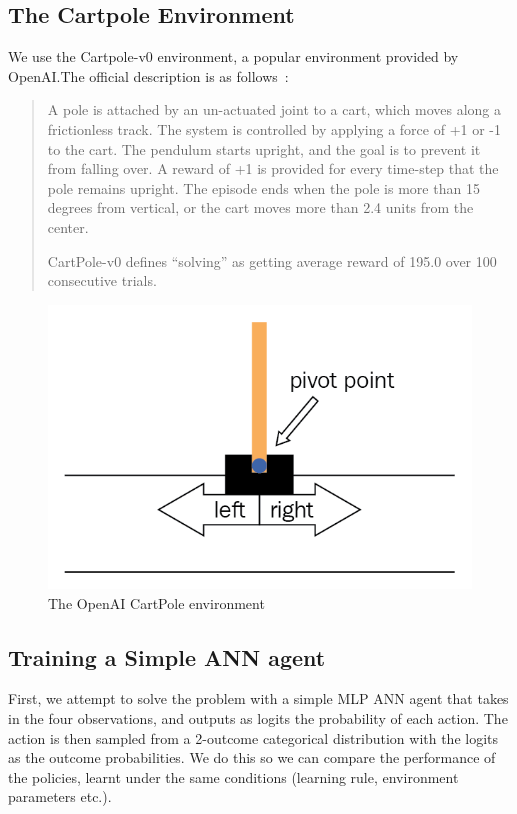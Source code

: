 \documentclass[fyp]{socreport}
\begin{document}
\subsection{The Cartpole Environment}


We use the Cartpole-v0 environment, a popular environment provided by
OpenAI.\@ The official description is as follows~\cite{openai_gym}:

\begin{quote} A pole is attached by an un-actuated joint to a cart, which moves
along a frictionless track. The system is controlled by applying a force of +1
or -1 to the cart. The pendulum starts upright, and the goal is to prevent it
from falling over. A reward of +1 is provided for every time-step that the pole
remains upright. The episode ends when the pole is more than 15 degrees from
vertical, or the cart moves more than 2.4 units from the center.

CartPole-v0 defines ``solving'' as getting average reward of 195.0 over 100
consecutive trials.
\end{quote}

\begin{figure}[htbp] \centering
  \includegraphics[width=.9\linewidth]{images/openai_gym.png}
  \caption{The OpenAI CartPole environment}
\end{figure}

\subsection{Training a Simple ANN agent}

First, we attempt to solve the problem with a simple MLP ANN agent that takes in
the four observations, and outputs as logits the probability of each action. The
action is then sampled from a 2-outcome categorical distribution with the logits
as the outcome probabilities. We do this so we can compare the performance of
the policies, learnt under the same conditions (learning rule, environment
parameters etc.).
\end{document}
